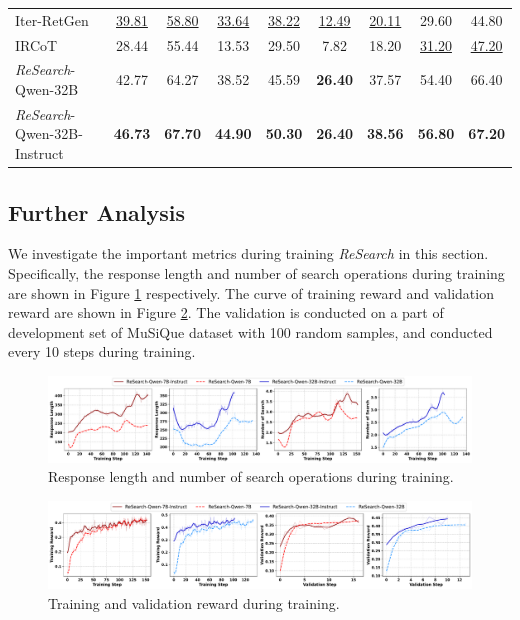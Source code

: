 \documentclass{article}
\begin{document}
\begin{table}[htbp]
\begin{center}
\begin{tabular}{lcc|cc|cc|cc}
Iter-RetGen & \underline{39.81} & \underline{58.80} & \underline{33.64} & \underline{38.22} & \underline{12.49} & \underline{20.11} & 29.60 & 44.80  \\
IRCoT & 28.44 & 55.44 & 13.53 & 29.50 & 7.82 & 18.20 & \underline{31.20} & \underline{47.20}  \\
\midrule
\textit{ReSearch}-{\small Qwen-32B} & 42.77 & 64.27 & 38.52 & 45.59 & \textbf{26.40} & 37.57 & 54.40 & 66.40  \\
\textit{ReSearch}-{\small Qwen-32B-Instruct} & \textbf{46.73} & \textbf{67.70} & \textbf{44.90} & \textbf{50.30} & \textbf{26.40} & \textbf{38.56} & \textbf{56.80} & \textbf{67.20}  \\
\bottomrule
\end{tabular}
\end{center}
\end{table}

\subsection{Further Analysis}

We investigate the important metrics during training \textit{ReSearch} in this section.
Specifically, the response length and number of search operations during training are shown in Figure \ref{fig:len} respectively. The curve of training reward and validation reward are shown in Figure \ref{fig:reward}. The validation is conducted on a part of development set of MuSiQue dataset with 100 random samples, and conducted every 10 steps during training.

\begin{figure}[htbp]
  \centering
  \includegraphics[width=\textwidth]{fig/len_train_val.pdf}
  \caption{Response length and number of search operations during training.}
  \label{fig:len}
\end{figure}

\begin{figure}[htbp]
  \centering
  \includegraphics[width=\textwidth]{fig/reward_train_val.pdf}
  \caption{Training and validation reward during training.}
  \label{fig:reward}
\end{figure}
\end{document}
